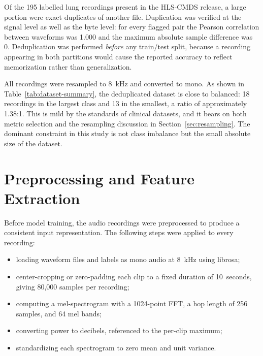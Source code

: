 \documentclass[conference]{IEEEtran}
\begin{document}
Of the 195 labelled lung recordings present in the HLS-CMDS release, a large
portion were exact duplicates of another file. Duplication was verified at the signal level as well as the byte
level: for every flagged pair the Pearson correlation between waveforms was 1.000
and the maximum absolute sample difference was 0. Deduplication was performed
\emph{before} any train/test split, because a recording appearing in both
partitions would cause the reported accuracy to reflect memorization rather than
generalization.

All recordings were resampled to 8~kHz and converted to mono. As shown in
Table~\ref{tab:dataset-summary}, the deduplicated dataset is close to balanced:
18 recordings in the largest class and 13 in the smallest, a ratio of
approximately 1.38:1. This is mild by the standards of clinical datasets, and it
bears on both metric selection and the resampling discussion in
Section~\ref{sec:resampling}. The dominant constraint in this study is not class
imbalance but the small absolute size of the dataset.

\section{Preprocessing and Feature Extraction}
Before model training, the audio recordings were preprocessed to produce a
consistent input representation. The following steps were applied to every
recording:

\begin{itemize}
    \item loading waveform files and labels as mono audio at 8~kHz using
    librosa;
    \item center-cropping or zero-padding each clip to a fixed duration of
    10~seconds, giving 80{,}000 samples per recording;
    \item computing a mel-spectrogram with a 1024-point FFT, a hop length of
    256 samples, and 64 mel bands;
    \item converting power to decibels, referenced to the per-clip maximum;
    \item standardizing each spectrogram to zero mean and unit variance.
\end{itemize}
\end{document}
